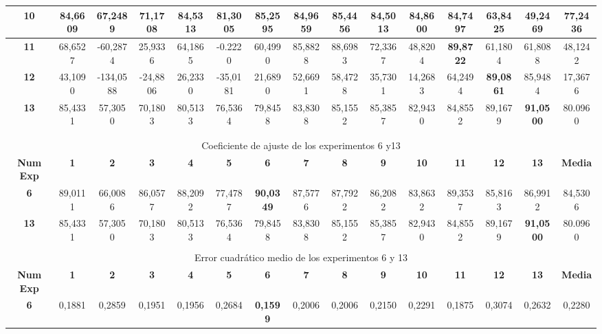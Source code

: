 \begin{table}[p]
\begin{sideways}
{\begin{tabular}{| c | c | c | c | c | c | c | c | c | c | c | c | c | c | c |}
		\hline
			\textbf{10} & 84,6609  & 67,2489 & 71,1708 & 84,5313 & 81,3005& 85,2595  & 84,9659  & 85,4456  & 84,5013  & \textbf{84,8600}   &  84,7497 &  63,8425 & 49,2469  & 77,2436 \\
		\hline
			\textbf{11} & 68,6527  &-60,2874 & 25,9336 & 64,1865 & -0.2220 & 60,4990  &85,8828  & 88,6983  & 72,3367  & 48,8204  &\textbf{89,8722}    & 61,1804  & 61,8088  & 48,1242 \\
		\hline
			\textbf{12} & 43,1090  &-134,0588 & -24,8806 & 26,2330 &-35,0181  & 21,6890 & 52,6691  & 58,4728   &35,7301  & 14,2683 &64,2494 & \textbf{89,0861} & 85,9484 & 17,3676 \\
		\hline
			\textbf{13} & 85,4331  & 57,3050 & 70,1803  & 80,5133 & 76,5364 & 79,8458 & 83,8308  & 85,1552 & 85,3857 & 82,9430 & 84,8552 &89,1679 &       \textbf{91,0500} &  80.0960\\
		\hline
                     \multicolumn{15}{|c|}{} \\
		\multicolumn{15}{|c|}{} \\
                     \hline
		\multicolumn{15}{|c|}{Coeficiente de ajuste de los experimentos 6 y13} \\
		\hline
			\textbf{Num Exp} & \textbf{1} & \textbf{2} & \textbf{3} & \textbf{4} & \textbf{5} &\textbf{6} & \textbf{7} & \textbf{8} & \textbf{9} & \textbf{10} & \textbf{11} & \textbf{12} & \textbf{13} & \textbf{Media}\\
		\hline 
			\textbf{6} & 89,0111  & 66,0086 & 86,0577 & 88,2092 & 77,4787 & \textbf{90,0349}  & 87,5776  & 87,7922  & 86,2082 &  83,8632 &  89,3537 & 85,8163 &  86,9912  & 84,5306 \\
		\hline
			\textbf{13} & 85,4331  & 57,3050 & 70,1803  & 80,5133 & 76,5364 & 79,8458 & 83,8308  & 85,1552 & 85,3857 & 82,9430 & 84,8552 &89,1679 &  \textbf{91,0500} &  80.0960\\
		\hline
			\multicolumn{15}{|c|}{} \\
		\hline 
			\multicolumn{15}{|c|}{Error cuadrático medio de los experimentos 6 y 13} \\
		\hline
			\textbf{Num Exp} & \textbf{1} & \textbf{2} & \textbf{3} & \textbf{4} & \textbf{5} &\textbf{6} & \textbf{7} & \textbf{8} & \textbf{9} & \textbf{10} & \textbf{11} & \textbf{12} & \textbf{13} & \textbf{Media}\\
		\hline 
			\textbf{6} & 0,1881  &  0,2859  &  0,1951  &  0,1956  &  0,2684  & \textbf{0,1599} & 0,2006  & 0,2006   &  0,2150  &  0,2291  &  0,1875   & 0,3074  &  0,2632  & 0,2280 \\

\end{tabular}}
\end{sideways}
\end{table}
